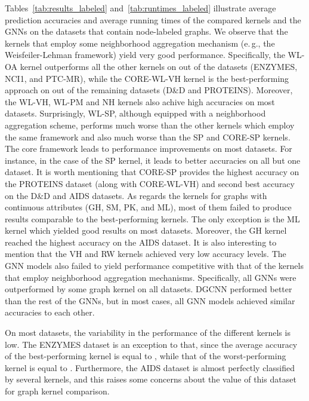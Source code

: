 \documentclass[twoside,11pt]{article}
\newcommand{\eg}{e.\,g., }
\begin{document}
Tables~\ref{tab:results_labeled} and~\ref{tab:runtimes_labeled} illustrate average prediction accuracies and average running times of the compared kernels and the GNNs on the datasets that contain node-labeled graphs.
We observe that the kernels that employ some neighborhood aggregation mechanism (\eg the Weisfeiler-Lehman framework) yield very good performance.
Specifically, the WL-OA kernel outperforms all the other kernels on  out of the  datasets (ENZYMES, NCI1, and PTC-MR), while the CORE-WL-VH kernel is the best-performing approach on  out of the remaining  datasets (D\&D and PROTEINS).
Moreover, the WL-VH, WL-PM and NH kernels also achive high accuracies on most datasets.
Surprisingly, WL-SP, although equipped with a neighborhood aggregation scheme, performs much worse than the other kernels which employ the same framework and also much worse than the SP and CORE-SP kernels.
The core framework leads to performance improvements on most datasets.
For instance, in the case of the SP kernel, it leads to better accuracies on all but one dataset.
It is worth mentioning that CORE-SP provides the highest accuracy on the PROTEINS dataset (along with CORE-WL-VH) and second best accuracy on the D\&D and AIDS datasets.
As regards the kernels for graphs with continuous attributes (GH, SM, PK, and ML), most of them failed to produce results comparable to the best-performing kernels.
The only exception is the ML kernel which yielded good results on most datasets.
Moreover, the GH kernel reached the highest accuracy on the AIDS dataset.
It is also interesting to mention that the VH and RW kernels achieved very low accuracy levels.
The  GNN models also failed to yield performance competitive with that of the kernels that employ neighborhood aggregation mechanisms.
Specifically, all GNNs were outperformed by some graph kernel on all  datasets.
DGCNN performed better than the rest of the GNNs, but in most cases, all GNN models achieved similar accuracies to each other.

On most datasets, the variability in the performance of the different kernels is low.
The ENZYMES dataset is an exception to that, since the average accuracy of the best-performing kernel is equal to , while that of the worst-performing kernel is equal to .
Furthermore, the AIDS dataset is almost perfectly classified by several kernels, and this raises some concerns about the value of this dataset for graph kernel comparison.
\end{document}
